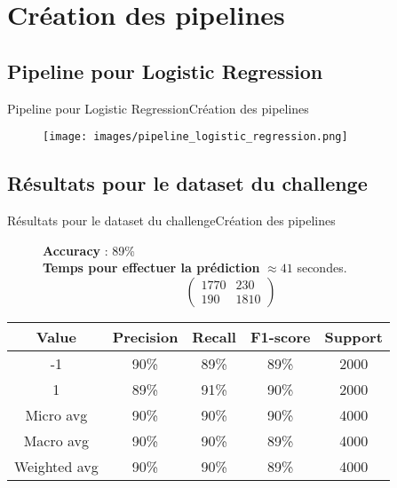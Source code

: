 \documentclass[usenames,dvipsnames]{beamer}
\begin{document}
\section{Création des pipelines}
\subsection{Pipeline pour Logistic Regression}
\begin{frame}{Pipeline pour Logistic Regression}{Création des pipelines}
\begin{figure}[!ht]
  \centering
  \texttt{[image: images/pipeline\_logistic\_regression.png]}
\end{figure}
\end{frame}

\subsection{Résultats pour le dataset du challenge}
\begin{frame}{Résultats pour le dataset du challenge}{Création des pipelines}
\begin{figure}[!ht]
  \centering
  \textbf{Accuracy} : 89\% \\
  \textbf{Temps pour effectuer la prédiction} $\approx41$ secondes.
  $$
  \begin{pmatrix}
  1770 & 230 \\
  190 & 1810
  \end{pmatrix}
  $$
\end{figure}

\begin{table}
  \centering
  \begin{tabular}{|c|c|c|c|c|}
    \hline
    \textbf{Value} & \textbf{Precision} & \textbf{Recall} & \textbf{F1-score} & \textbf{Support}\\
    \hline
    \hline
    -1 & 90\% & 89\% & 89\% & 2000\\
    \hline
    1 & 89\% & 91\% & 90\% & 2000\\
    \hline
    Micro avg & 90\% & 90\% & 90\% & 4000\\
    \hline
    Macro avg & 90\% & 90\% & 89\% & 4000\\
    \hline
    Weighted avg & 90\% & 90\% & 89\% & 4000\\
    \hline
  \end{tabular}
\end{table}
\end{frame}
\end{document}

